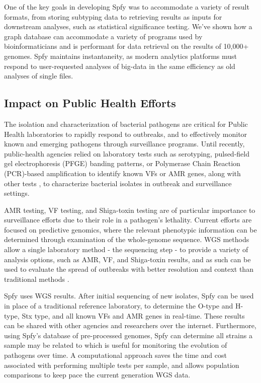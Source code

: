 \documentclass{article}
\begin{document}
One of the key goals in developing Spfy was to accommodate a variety of result formats, from storing subtyping data to retrieving results as inputs for downstream analyses, such as statistical significance testing. We've shown how a graph database can accommodate a variety of programs used by bioinformaticians and is performant for data retrieval on the results of 10,000+ genomes. Spfy maintains instantaneity, as modern analytics platforms must respond to user-requested analyses of big-data in the same efficiency as old analyses of single files.

\subsection{Impact on Public Health Efforts}

The isolation and characterization of bacterial pathogens are critical for Public Health laboratories to rapidly respond to outbreaks, and to effectively monitor known and emerging pathogens through surveillance programs.
Until recently, public-health agencies relied on laboratory tests such as serotyping, pulsed-field gel electrophoresis (PFGE) banding patterns, or Polymerase Chain Reaction (PCR)-based amplification to identify known VFs or AMR genes, along with other tests \cite{ronholm2016navigating}, to characterize bacterial isolates in outbreak and surveillance settings.

AMR testing, VF testing, and Shiga-toxin testing are of particular importance to surveillance efforts due to their role in a pathogen's lethality.
Current efforts are focused on predictive genomics, where the relevant phenotypic information can be determined through examination of the whole-genome sequence.
WGS methods allow a single laboratory method - the sequencing step - to provide a variety of analysis options, such as AMR, VF, and Shiga-toxin results, and as such can be used to evaluate the spread of outbreaks with better resolution and context than traditional methods \cite{ronholm2016navigating}.

Spfy uses WGS results.
After initial sequencing of new isolates, Spfy can be used in place of a traditional reference laboratory, to determine the O-type and H-type, Stx type, and all known VFs and AMR genes in real-time.
These results can be shared with other agencies and researchers over the internet.
Furthermore, using Spfy's database of pre-processed genomes, Spfy can determine all strains a sample may be related to which is useful for monitoring the evolution of pathogens over time.
A computational approach saves the time and cost associated with performing multiple tests per sample, and allows population comparisons to keep pace the current generation WGS data.
\end{document}
